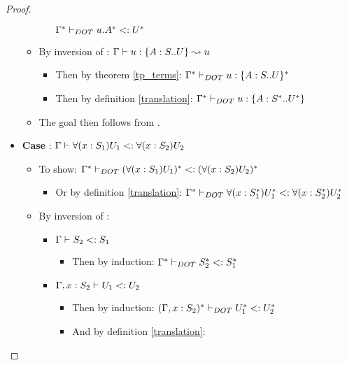 \begin{proof}
\begin{itemize}
\begin{itemize}
\begin{itemize}
                    $\Gamma^{*} \vdash_{DOT} u.A^{*} <: U^{*}$
            \end{itemize}
            \item By inversion of :
                $\Gamma \vdash u: \{A : S .. U\} \leadsto u$
            \begin{itemize}
                \item Then by theorem \ref{tp_terms}:
                    $\Gamma^{*} \vdash_{DOT} u: \{A : S .. U\}^{*}$
                \item Then by definition \ref{translation}:
                    $\Gamma^{*} \vdash_{DOT} u: \{A : S^{*} .. U^{*}\}$
            \end{itemize}
            \item The goal then follows from .
        \end{itemize}
        \item \textbf{Case} :
            $\Gamma \vdash \forall(x:S_1)U_1 <: \forall(x:S_2)U_2$
        \begin{itemize}
            \item To show: $\Gamma^{*} \vdash_{DOT} (\forall(x:S_1)U_1)^{*} <: (\forall(x:S_2)U_2)^{*}$
            \begin{itemize}
                \item Or by definition \ref{translation}:
                    $\Gamma^{*} \vdash_{DOT} \forall(x:S_1^{*})U_1^{*} <: \forall(x:S_2^{*})U_2^{*}$
            \end{itemize}
            \item By inversion of :
            \begin{itemize}
                \item $\Gamma \vdash S_2 <: S_1$
                \begin{itemize}
                    \item Then by induction:
                        $\Gamma^{*} \vdash_{DOT} S_2^{*} <: S_1^{*}$
                \end{itemize}
                \item $\Gamma, x: S_2 \vdash U_1 <: U_2$
                \begin{itemize}
                    \item Then by induction: $(\Gamma, x: S_2)^{*} \vdash_{DOT} U_1^{*} <: U_2^{*}$
                    \item And by definition \ref{translation}:

\end{itemize}
\end{itemize}
\end{itemize}
\end{itemize}
\end{proof}
